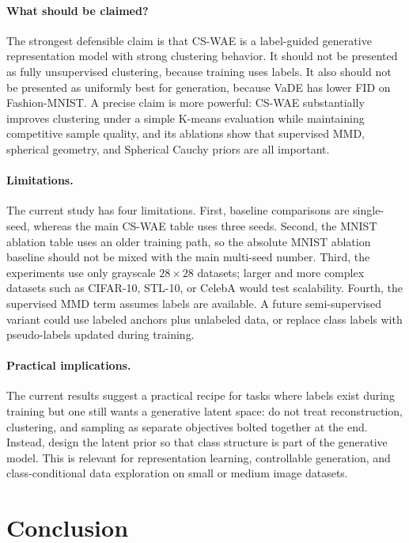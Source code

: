 \documentclass[10pt]{article}
\begin{document}
\paragraph{What should be claimed?}
The strongest defensible claim is that CS-WAE is a label-guided generative representation model with strong clustering behavior. It should not be presented as fully unsupervised clustering, because training uses labels. It also should not be presented as uniformly best for generation, because VaDE has lower FID on Fashion-MNIST. A precise claim is more powerful: CS-WAE substantially improves clustering under a simple K-means evaluation while maintaining competitive sample quality, and its ablations show that supervised MMD, spherical geometry, and Spherical Cauchy priors are all important.

\paragraph{Limitations.}
The current study has four limitations. First, baseline comparisons are single-seed, whereas the main CS-WAE table uses three seeds. Second, the MNIST ablation table uses an older training path, so the absolute MNIST ablation baseline should not be mixed with the main multi-seed number. Third, the experiments use only grayscale $28\times28$ datasets; larger and more complex datasets such as CIFAR-10, STL-10, or CelebA would test scalability. Fourth, the supervised MMD term assumes labels are available. A future semi-supervised variant could use labeled anchors plus unlabeled data, or replace class labels with pseudo-labels updated during training.

\paragraph{Practical implications.}
The current results suggest a practical recipe for tasks where labels exist during training but one still wants a generative latent space: do not treat reconstruction, clustering, and sampling as separate objectives bolted together at the end. Instead, design the latent prior so that class structure is part of the generative model. This is relevant for representation learning, controllable generation, and class-conditional data exploration on small or medium image datasets.

\section{Conclusion}
\end{document}
